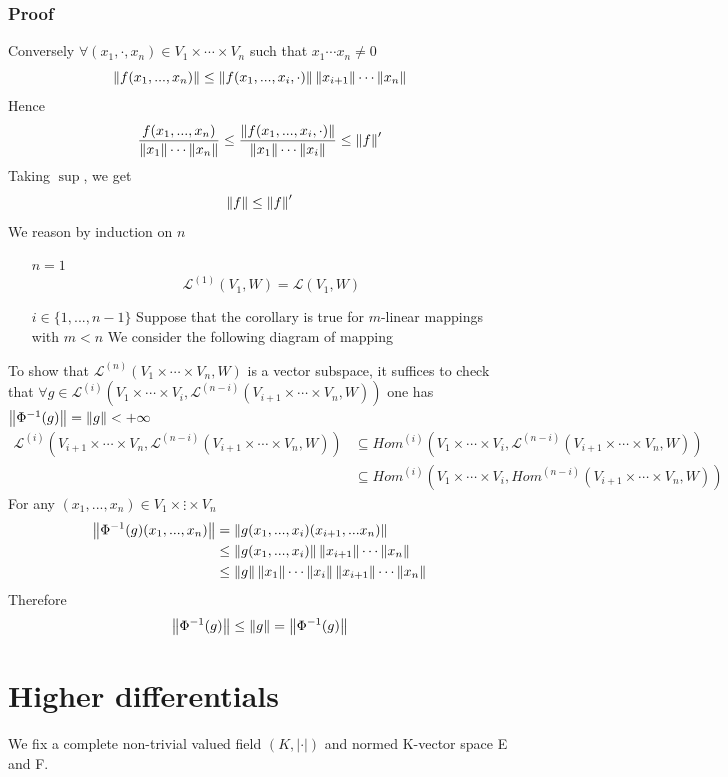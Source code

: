 \documentclass{book}
\newcommand{\abs}[1]{\left\lvert #1 \right\rvert}
\begin{document}
\subsection{Proof}
Conversely $\forall(x_1,\cdot,x_n)\in V_1\times\cdots\times V_n$ such that $x_1\cdots x_n\neq0$
$$\left\lVert f(x_1,...,x_n) \right\rVert\leq\left\lVert f(x_1,...,x_i,\cdot) \right\rVert\left\lVert x_{i+1} \right\rVert\cdots\left\lVert x_n \right\rVert$$
Hence 
$$\frac{f(x_1,...,x_n)}{\left\lVert x_1 \right\rVert\cdots\left\lVert x_n \right\rVert}\leq\frac{\left\lVert f(x_1,...,x_i,\cdot) \right\rVert}{\left\lVert x_1 \right\rVert\cdots\left\lVert x_i \right\rVert}\leq\left\lVert f \right\rVert'$$
Taking $\sup$, we get $$\left\lVert f \right\rVert\leq\left\lVert f \right\rVert'$$
We reason by induction on $n$
\begin{itemize}
    \item [$n=1$]$$\mathscr{L}^{(1)}(V_1,W)=\mathscr{L}(V_1,W)$$
    \item [$i\in \{1,...,n-1\}$]
    Suppose that the corollary is true for $m$-linear mappings with $m<n$ We consider the following diagram of mapping 








\end{itemize}
To show that $\mathscr{L}^{(n)}(V_1\times\cdots\times V_n,W)$ is a vector subspace, it suffices to check that $\forall g\in \mathscr{L}^{(i)}(V_1\times\cdots\times V_i,\mathscr{L}^{(n-i)}(V_{i+1}\times\cdots\times V_n,W))$ one has $\left\lVert \Phi^{-1}(g) \right\rVert=\left\lVert g \right\rVert<+\infty$
$$\begin{aligned}
    \mathscr{L}^{(i)}(V_{i+1}\times\cdots\times V_n,\mathscr{L}^{(n-i)}(V_{i+1}\times\cdots\times V_n,W)) &\subseteq Hom^{(i)}(V_1\times\cdots\times V_i,\mathscr{L}^{(n-i)}(V_{i+1}\times\cdots\times V_n,W))\\
    &\subseteq Hom^{(i)}(V_1\times\cdots\times V_i,Hom^{(n-i)}(V_{i+1}\times\cdots\times V_n,W))
\end{aligned}$$
For any $(x_1,...,x_n)\in V_1\times\vdots\times V_n$
$$
\begin{aligned}
    \left\lVert \Phi^{-1}(g)(x_1,...,x_n) \right\rVert &=\left\lVert g(x_1,...,x_i)(x_{i+1},...x_n) \right\rVert\\
    &\leq \left\lVert g(x_1,...,x_i) \right\rVert\left\lVert x_{i+1} \right\rVert\cdots\left\lVert x_n \right\rVert\\
    &\leq\left\lVert g \right\rVert\left\lVert x_1 \right\rVert\cdots\left\lVert x_i \right\rVert\left\lVert x_{i+1} \right\rVert\cdots\left\lVert x_n \right\rVert
\end{aligned}
$$
Therefore $$\left\lVert \Phi^{-1}(g) \right\rVert\leq\left\lVert g \right\rVert=\left\lVert \Phi^{-1}(g) \right\rVert$$
\chapter{Higher differentials}
We fix a complete non-trivial valued field $(K,\abs\cdot)$ and normed K-vector space E and F.
\end{document}
